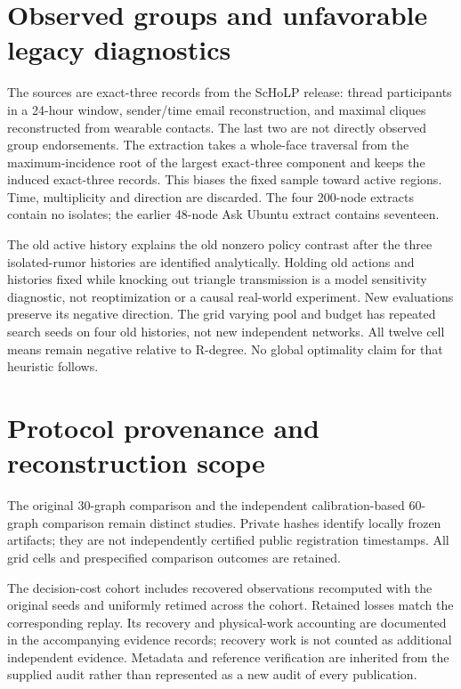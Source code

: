 \documentclass[preprint,11pt,sort&compress]{elsarticle}
\begin{document}
\FloatBarrier\section{Observed groups and unfavorable legacy diagnostics}
The sources are exact-three records from the ScHoLP release: thread participants in a 24-hour window, sender/time email reconstruction, and maximal cliques reconstructed from wearable contacts. The last two are not directly observed group endorsements. The extraction takes a whole-face traversal from the maximum-incidence root of the largest exact-three component and keeps the induced exact-three records. This biases the fixed sample toward active regions. Time, multiplicity and direction are discarded. The four 200-node extracts contain no isolates; the earlier 48-node Ask Ubuntu extract contains seventeen.

The old active history explains the old nonzero policy contrast after the three isolated-rumor histories are identified analytically. Holding old actions and histories fixed while knocking out triangle transmission is a model sensitivity diagnostic, not reoptimization or a causal real-world experiment. New evaluations preserve its negative direction. The grid varying pool and budget has repeated search seeds on four old histories, not new independent networks. All twelve cell means remain negative relative to R-degree. No global optimality claim for that heuristic follows.

\FloatBarrier\section{Protocol provenance and reconstruction scope}
The original 30-graph comparison and the independent calibration-based 60-graph comparison remain distinct studies. Private hashes identify locally frozen artifacts; they are not independently certified public registration timestamps. All grid cells and prespecified comparison outcomes are retained.

The decision-cost cohort includes recovered observations recomputed with the original seeds and uniformly retimed across the cohort. Retained losses match the corresponding replay. Its recovery and physical-work accounting are documented in the accompanying evidence records; recovery work is not counted as additional independent evidence. Metadata and reference verification are inherited from the supplied audit rather than represented as a new audit of every publication.
\end{document}
